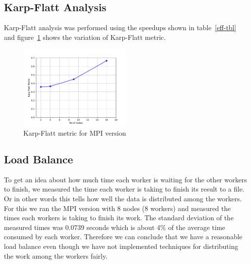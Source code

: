 \documentclass[12pt]{article}
\begin{document}
\subsection{Karp-Flatt Analysis}
Karp-Flatt analysis was performed using the speedups shown in table~\ref{eff-tbl} and figure~\ref{evals} shows the variation of Karp-Flatt
metric.

\begin{figure}[H]
\centering
\includegraphics[width=0.5\textwidth]{fig/evals.pdf}
\caption{Karp-Flatt metric for MPI version \label{evals}}
\end{figure}

\subsection{Load Balance}
To get an idea about how much time each worker is waiting for the other workers to finish, we measured the time each worker is taking to finish 
its result to a file. Or in other words this tells how well the data is distributed among the workers. For this we ran the MPI version with 8 nodes (8 workers) and
measured the times each workers is taking to finish its work. The standard deviation of the measured times was 0.0739 seconds which is about 4\% of the average
time consumed by each worker. Therefore we can conclude that we have a reasonable load balance even though we have not implemented techniques for distributing 
the work among the workers fairly.
\end{document}
